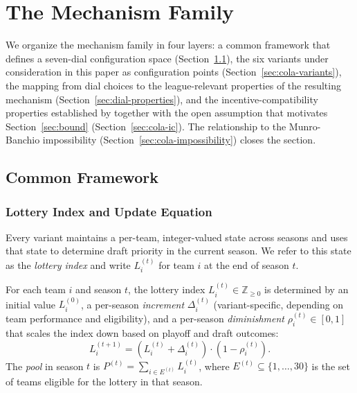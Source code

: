 \section{The \cola{} Mechanism Family}
\label{sec:cola-family}


We organize the \cola{} mechanism family in four layers: a common framework that defines a seven-dial configuration space (Section~\ref{sec:cola-common}), the six variants under consideration in this paper as configuration points (Section~\ref{sec:cola-variants}), the mapping from dial choices to the league-relevant properties of the resulting mechanism (Section~\ref{sec:dial-properties}), and the incentive-compatibility properties established by \citet{highley2026cola} together with the open assumption that motivates Section~\ref{sec:bound} (Section~\ref{sec:cola-ic}). The relationship to the Munro-Banchio impossibility (Section~\ref{sec:cola-impossibility}) closes the section.

\subsection{Common Framework}
\label{sec:cola-common}

\subsubsection{Lottery Index and Update Equation}
\label{sec:cola-index}

Every \cola{} variant maintains a per-team, integer-valued state across seasons and uses that state to determine draft priority in the current season. We refer to this state as the \emph{lottery index} and write $L_i^{(t)}$ for team $i$ at the end of season $t$.

\begin{definition}
\label{def:index}
For each team $i$ and season $t$, the lottery index $L_i^{(t)} \in \mathbb{Z}_{\geq 0}$ is determined by an initial value $L_i^{(0)}$, a per-season \emph{increment} $\Delta_i^{(t)}$ (variant-specific, depending on team performance and eligibility), and a per-season \emph{diminishment} $\rho_i^{(t)} \in [0, 1]$ that scales the index down based on playoff and draft outcomes:
\begin{equation}
\label{eq:index-update}
L_i^{(t+1)} = \left(L_i^{(t)} + \Delta_i^{(t)}\right) \cdot \left(1 - \rho_i^{(t)}\right).
\end{equation}
The \emph{pool} in season $t$ is $P^{(t)} = \sum_{i \in E^{(t)}} L_i^{(t)}$, where $E^{(t)} \subseteq \{1, \ldots, 30\}$ is the set of teams eligible for the lottery in that season.
\end{definition}

